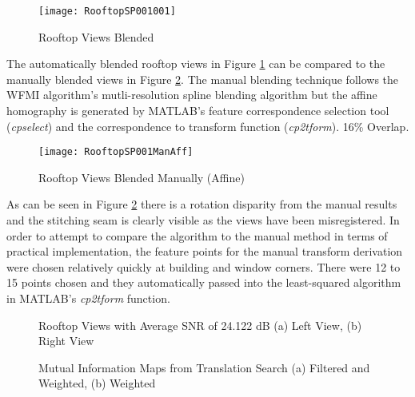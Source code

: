 \begin{figure}[h]
\centering
\texttt{[image: RooftopSP001001]}
\caption{Rooftop Views Blended}
\label{RooftopStitched}
\end{figure}

The automatically blended rooftop views in Figure \ref{RooftopStitched} can be compared to the manually blended views in Figure \ref{RooftopStitchedManual}. The manual blending technique follows the WFMI algorithm's mutli-resolution spline blending algorithm but the affine homography is generated by MATLAB\textsuperscript{\textregistered}'s feature correspondence selection tool (\textit{cpselect}) and the correspondence to transform function (\textit{cp2tform}). 16\% Overlap.

\begin{figure}[h]
\centering
\texttt{[image: RooftopSP001ManAff]}
\caption{Rooftop Views Blended Manually (Affine)}
\label{RooftopStitchedManual}
\end{figure}

As can be seen in Figure \ref{RooftopStitchedManual} there is a rotation disparity from the manual results and the stitching seam is clearly visible as the views have been misregistered. In order to attempt to compare the algorithm to the manual method in terms of practical implementation, the feature points for the manual transform derivation were chosen relatively quickly at building and window corners. There were 12 to 15 points chosen and they automatically passed into the least-squared algorithm in MATLAB\textsuperscript{\textregistered}'s \textit{cp2tform} function.


\begin{figure}[h]
\centering
{}
\caption{Rooftop Views with Average SNR of 24.122 dB (a) Left View, (b) Right View}
\label{RooftopNoisyImages}
\end{figure}

\begin{figure}[h]
\centering
{}
\caption{Mutual Information Maps from Translation Search (a) Filtered and Weighted, (b) Weighted}
\label{RooftopNoisyImagesMI}
\end{figure}


